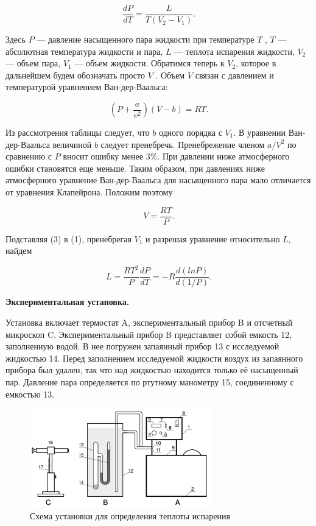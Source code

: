 \documentclass[11pt]{article}
\begin{document}
\begin{equation}
    \frac{dP}{dT}=\frac{L}{T(V_2-V_1)}.
\end{equation}

Здесь $P$ — давление насыщенного пара жидкости при температуре $T$ , $T$ — абсолютная температура жидкости и пара, $L$ — теплота испарения жидкости, $V_2$ — объем пара, $V_1$ — объем жидкости.
Обратимся теперь к $V_2$, которое в дальнейшем будем обозначать просто $V$ . Объем $V$ связан с давлением и температурой уравнением Ван-дер-Ваальса:

\begin{equation}
    \left(P+\frac{a}{v^2}\right)(V-b)=RT.
\end{equation}

Из рассмотрения таблицы следует, что $b$ одного порядка с $V_1$. В уравнении Ван-дер-Ваальса величиной $b$ следует пренебречь. Пренебрежение членом $a/V^2$ по сравнению с $P$ вносит ошибку менее 3$\%$. При давлении ниже атмосферного ошибки становятся еще меньше. Таким образом, при давлениях ниже атмосферного уравнение Ван-дер-Ваальса для насыщенного пара мало отличается от уравнения Клапейрона. Положим поэтому

\begin{equation}
    V=\frac{RT}{P}.
\end{equation}

Подставляя (3) в (1), пренебрегая $V_1$ и разрешая уравнение относительно $L$, найдем

\begin{equation}
    L=\frac{RT^2}{P}\frac{dP}{dT}=-R\frac{d(lnP)}{d(1/P)}.
\end{equation}

\par \textbf{Экспериментальная установка.}

Установка включает термостат A, экспериментальный прибор B и отсчетный микроскоп C. Экспериментальный прибор B представляет собой емкость 12, заполненную водой. В нее погружен запаянный прибор 13 с исследуемой жидкостью 14. Перед заполнением исследуемой жидкости воздух из запаянного прибора был удален, так что над жидкостью находится только её насыщенный пар. Давление пара определяется по ртутному манометру 15, соединенному с емкостью 13.

\begin{figure}[H]
\centering
\captionsetup{justification=centering}
\includegraphics[width=0.7\textwidth]{ris_1.png}
\caption{Схема установки для определения теплоты испарения}
\end{figure}
\end{document}
